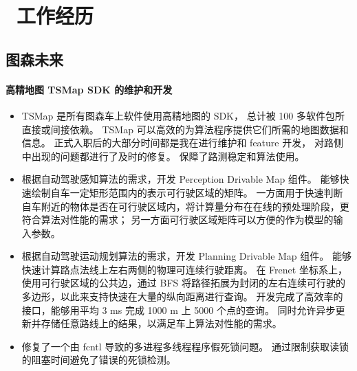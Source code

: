 \section{\faUsers\ 工作经历}


\subsection{图森未来}
    \paragraph{高精地图 TSMap SDK 的维护和开发}
        \begin{itemize}
            \item 
                TSMap 是所有图森车上软件使用高精地图的 SDK， 总计被 100 多软件包所直接或间接依赖。
                TSMap 可以高效的为算法程序提供它们所需的地图数据和信息。
                正式入职后的大部分时间都是我在进行维护和 feature 开发，
                对路侧中出现的问题都进行了及时的修复。
                保障了路测稳定和算法使用。
            \item 
                根据自动驾驶感知算法的需求，开发 Perception Drivable Map 组件。
                能够快速绘制自车一定矩形范围内的表示可行驶区域的矩阵。
                一方面用于快速判断自车附近的物体是否在可行驶区域内，将计算量分布在在线的预处理阶段，更符合算法对性能的需求；
                另一方面可行驶区域矩阵可以方便的作为模型的输入参数。
            \item 
                根据自动驾驶运动规划算法的需求，开发 Planning Drivable Map 组件。
                能够快速计算路点法线上左右两侧的物理可连续行驶距离。
                在 Frenet 坐标系上，使用可行驶区域的公共边，通过 BFS 将路径拓展为封闭的左右连续可行驶的多边形，以此来支持快速在大量的纵向距离进行查询。
                开发完成了高效率的接口，能够用平均 3 ms 完成 1000 m 上 5000 个点的查询。
                同时允许异步更新并存储任意路线上的结果，以满足车上算法对性能的需求。
            \item 
                修复了一个由 fcntl 导致的多进程多线程程序假死锁问题。
                通过限制获取读锁的阻塞时间避免了错误的死锁检测。
        \end{itemize}

